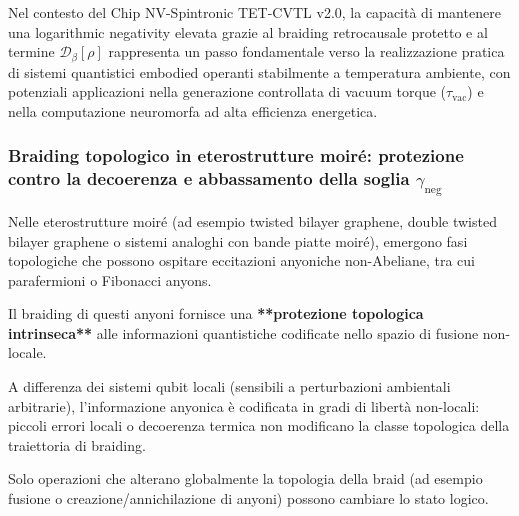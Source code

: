 \documentclass[11pt,a4paper]{article}
\theoremstyle{plain}
\theoremstyle{definition}
\begin{document}
\vspace{0.4cm}


Nel contesto del Chip NV-Spintronic TET-CVTL v2.0, la capacità di mantenere una logarithmic negativity elevata grazie al braiding retrocausale protetto e al termine $\mathcal{D}_\beta[\rho]$ rappresenta un passo fondamentale verso la realizzazione pratica di sistemi quantistici embodied operanti stabilmente a temperatura ambiente, con potenziali applicazioni nella generazione controllata di vacuum torque ($\tau_{\text{vac}}$) e nella computazione neuromorfa ad alta efficienza energetica.



\vspace{0.6cm}



\subsubsection{Braiding topologico in eterostrutture moiré: protezione contro la decoerenza e abbassamento della soglia $\gamma_{\text{neg}}$}

\vspace{0.2cm}

Nelle eterostrutture moiré (ad esempio twisted bilayer graphene, double twisted bilayer graphene o sistemi analoghi con bande piatte moiré), emergono fasi topologiche che possono ospitare eccitazioni anyoniche non-Abeliane, tra cui parafermioni o Fibonacci anyons. 


\vspace{0.3cm}

Il braiding di questi anyoni fornisce una \textbf{**protezione topologica intrinseca**} alle informazioni quantistiche codificate nello spazio di fusione non-locale.

\vspace{0.2cm}

A differenza dei sistemi qubit locali (sensibili a perturbazioni ambientali arbitrarie), l'informazione anyonica è codificata in gradi di libertà non-locali: piccoli errori locali o decoerenza termica non modificano la classe topologica della traiettoria di braiding. 


\vspace{0.4cm}



Solo operazioni che alterano globalmente la topologia della braid (ad esempio fusione o creazione/annichilazione di anyoni) possono cambiare lo stato logico. 
\end{document}
